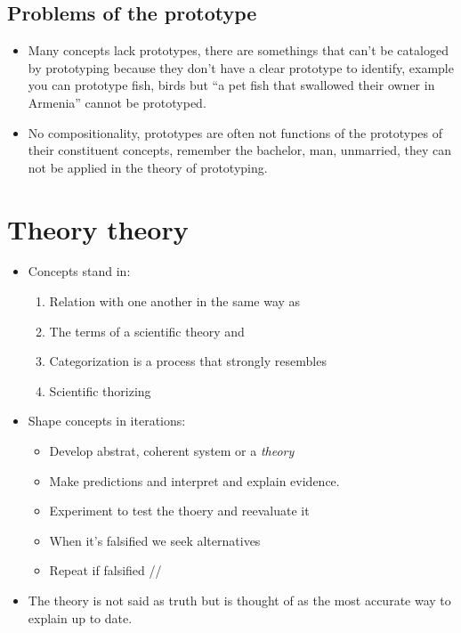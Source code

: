 \subsection{Problems of the prototype}
\begin{itemize}
    \item Many concepts lack prototypes, there are somethings that can't be cataloged by prototyping because they don't have a clear prototype to identify, example you can prototype fish, birds but ``a pet fish that swallowed their owner in Armenia'' cannot be prototyped.
    \item No compositionality, prototypes are often not functions of the prototypes of their constituent concepts, remember the bachelor, man, unmarried, they can not be applied in the theory of prototyping.
\end{itemize}



\section{Theory theory}
\begin{itemize}
    \item Concepts stand in:
        \begin{enumerate}
            \item Relation with one another in the same way as 
            \item The terms of a scientific theory and 
            \item Categorization is a process that strongly resembles 
            \item Scientific thorizing
        \end{enumerate}
    
    \item Shape concepts in iterations: 
        \begin{itemize}
            \item Develop abstrat, coherent system or a \emph{theory}
            \item Make predictions and interpret and explain evidence.
            \item Experiment to test the thoery and reevaluate it 
            \item When it's falsified we seek alternatives
            \item Repeat if falsified // 
        \end{itemize}
    
        
    \item The theory is not said as truth but is thought of as the most accurate way to explain up to date.
\end{itemize}


